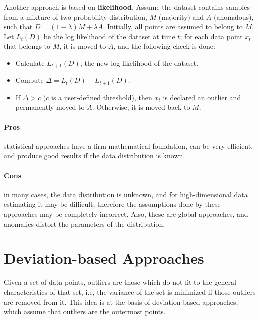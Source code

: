 Another approach is based on \textbf{likelihood}. Assume the dataset contains samples from a mixture of two probability distribution, $M$ (majority) and $A$ (anomalous), such that $D = (1-\lambda)M + \lambda A$. Initially, all points are assumed to belong to $M$. Let $L_t(D)$ be the log likelihood of the dataset at time $t$; for each data point $x_t$ that belongs to $M$, it is moved to $A$, and the following check is done:
\begin{itemize}
    \item Calculate $L_{t+1}(D)$, the new log-likelihood of the dataset.
    \item Compute $\Delta = L_t(D) - L_{t+1}(D)$.
    \item If $\Delta > c$ ($c$ is a user-defined threshold), then $x_t$ is declared an outlier and permanently moved to $A$. Otherwise, it is moved back to $M$.
\end{itemize}

\paragraph{Pros} statistical approaches have a firm mathematical foundation, can be very efficient, and produce good results if the data distribution is known.

\paragraph{Cons} in many cases, the data distribution is unknown, and for high-dimensional data estimating it may be difficult, therefore the assumptions done by these approaches may be completely incorrect. Also, these are global approaches, and anomalies distort the parameters of the distribution.

\section{Deviation-based Approaches}

Given a set of data points, outliers are those which do not fit to the general characteristics of that set, i.e, the variance of the set is minimized if those outliers are removed from it. This idea is at the basis of deviation-based approaches, which assume that outliers are the outermost points.

